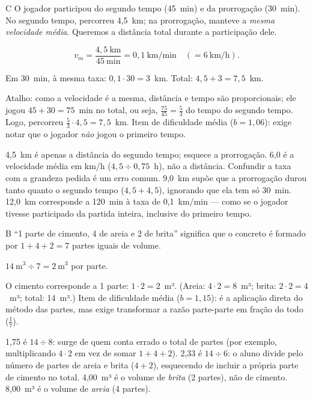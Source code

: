 \begin{resolucao}{C}
 O jogador participou do segundo tempo (45~min) e da
prorrogação (30~min). No segundo tempo, percorreu 4,5~km; na prorrogação, manteve a
\emph{mesma velocidade média}. Queremos a distância total durante a participação dele.

\[
v_m = \frac{4{,}5~\text{km}}{45~\text{min}} = 0{,}1~\text{km/min} \quad(= 6~\text{km/h}).
\]

 Em 30~min, à mesma taxa:
$0{,}1 \cdot 30 = 3$~km. Total: $4{,}5 + 3 = 7{,}5$~km.

Atalho: como a velocidade é a mesma, distância e tempo são proporcionais; ele jogou
$45 + 30 = 75$~min no total, ou seja, $\frac{75}{45} = \frac{5}{3}$ do tempo do segundo
tempo. Logo, percorreu $\frac{5}{3} \cdot 4{,}5 = 7{,}5$~km. Item de dificuldade média
($b = 1{,}06$): exige notar que o jogador \emph{não} jogou o primeiro tempo.
\begin{distratores}
 4,5~km é apenas a distância do segundo tempo; esquece a prorrogação.
 6,0 é a velocidade média em km/h ($4{,}5 \div 0{,}75$~h), não a distância.
Confundir a taxa com a grandeza pedida é um erro comum.
 9,0~km supõe que a prorrogação durou tanto quanto o segundo tempo
($4{,}5 + 4{,}5$), ignorando que ela tem só 30~min.
 12,0~km corresponde a 120~min à taxa de 0,1~km/min — como se o jogador tivesse
participado da partida inteira, inclusive do primeiro tempo.
\end{distratores}
\end{resolucao}

\begin{resolucao}{B}
 ``1 parte de cimento, 4 de areia e 2 de brita''
significa que o concreto é formado por $1 + 4 + 2 = 7$ partes iguais de volume.

 $14~\text{m}^3 \div 7 = 2~\text{m}^3$ por parte.

 O cimento corresponde a 1 parte: $1 \cdot 2 = 2$~m³.
(Areia: $4 \cdot 2 = 8$~m³; brita: $2 \cdot 2 = 4$~m³; total: 14~m³.)
Item de dificuldade média ($b = 1{,}15$): é a aplicação direta do método das partes,
mas exige transformar a razão parte-parte em fração do todo ($\frac{1}{7}$).
\begin{distratores}
 1,75 é $14 \div 8$: surge de quem conta errado o total de partes (por
exemplo, multiplicando $4 \cdot 2$ em vez de somar $1 + 4 + 2$).
 2,33 é $14 \div 6$: o aluno divide pelo número de partes de areia e brita
($4 + 2$), esquecendo de incluir a própria parte de cimento no total.
 4,00~m³ é o volume de \emph{brita} (2 partes), não de cimento.
 8,00~m³ é o volume de \emph{areia} (4 partes).
\end{distratores}
\end{resolucao}


